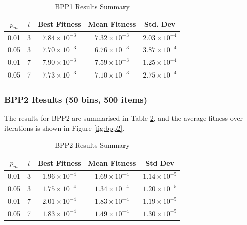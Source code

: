 \documentclass[conference]{IEEEtran}
\begin{document}
\begin{table}[htbp]
    \caption{BPP1 Results Summary}
    \begin{center}
        \begin{tabular}{|c|c|c|c|c|}
            \hline
            \textbf{$p_m$} & \textbf{\(t\)} & \textbf{Best Fitness}   & \textbf{Mean Fitness}   & \textbf{Std. Dev}       \\
            \hline
            0.01           & 3              & \(7.84 \times 10^{-3}\) & \(7.32 \times 10^{-3}\) & \(2.03 \times 10^{-4}\) \\
            \hline
            0.05           & 3              & \(7.70 \times 10^{-3}\) & \(6.76 \times 10^{-3}\) & \(3.87 \times 10^{-4}\) \\
            \hline
            0.01           & 7              & \(7.90 \times 10^{-3}\) & \(7.59 \times 10^{-3}\) & \(1.25 \times 10^{-4}\) \\
            \hline
            0.05           & 7              & \(7.73 \times 10^{-3}\) & \(7.10 \times 10^{-3}\) & \(2.75 \times 10^{-4}\) \\
            \hline
        \end{tabular}
        \label{tab:bpp1}
    \end{center}
\end{table}


\subsubsection{BPP2 Results (50 bins, 500 items)}
The results for BPP2 are summarised in Table \ref{tab:bpp2}, and the average fitness over iterations is shown in Figure \ref{fig:bpp2}.

\begin{table}[htbp]
    \caption{BPP2 Results Summary}
    \begin{center}
        \begin{tabular}{|c|c|c|c|c|}
            \hline
            \textbf{$p_m$} & \textbf{\(t\)} & \textbf{Best Fitness}   & \textbf{Mean Fitness}   & \textbf{Std Dev}        \\
            \hline
            0.01           & 3              & \(1.96 \times 10^{-4}\) & \(1.69 \times 10^{-4}\) & \(1.14 \times 10^{-5}\) \\
            \hline
            0.05           & 3              & \(1.75 \times 10^{-4}\) & \(1.34 \times 10^{-4}\) & \(1.20 \times 10^{-5}\) \\
            \hline
            0.01           & 7              & \(2.01 \times 10^{-4}\) & \(1.83 \times 10^{-4}\) & \(1.19 \times 10^{-5}\) \\
            \hline
            0.05           & 7              & \(1.83 \times 10^{-4}\) & \(1.49 \times 10^{-4}\) & \(1.30 \times 10^{-5}\) \\
            \hline
        \end{tabular}
        \label{tab:bpp2}
    \end{center}
\end{table}
\end{document}
